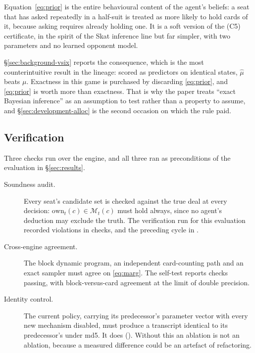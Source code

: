 Equation~\eqref{eq:prior} is the entire behavioural content of the agent's beliefs: a seat that has
asked repeatedly in a half-suit is treated as more likely to hold cards of it, because asking
requires already holding one. It is a soft version of the (C5) certificate, in the spirit of the Skat
inference line \cite{solinas-supervised,rebstock-inference,buro-kermit} but far simpler, with two
parameters and no learned opponent model.

\S\ref{sec:background-vsix} reports the consequence, which is the most counterintuitive result in the
lineage: scored as predictors on identical states, $\hat\mu$ beats $\mu$. Exactness in this game is
purchased by discarding \eqref{eq:prior}, and \eqref{eq:prior} is worth more than exactness. That is
why the paper treats ``exact Bayesian inference'' as an assumption to test rather than a property to
assume, and \S\ref{sec:development-alloc} is the second occasion on which the rule paid.

\subsection{Verification}
\label{sec:inference-verify}

Three checks run over the engine, and all three ran as preconditions of the evaluation in
\S\ref{sec:results}.

\begin{description}
\item[Soundness audit.] Every seat's candidate set is checked against the true deal at every
  decision: $\mathrm{own}_t(c) \in \mathcal{M}_t(c)$ must hold always, since no agent's deduction may
  exclude the truth. The verification run for this evaluation recorded
  \vsevenVerifyViolations{} violations in \vsevenVerifyChecks{} checks, and the preceding cycle
  \vsixAuditViolations{} in \vsixAuditChecks{}.
\item[Cross-engine agreement.] The block dynamic program, an independent card-counting path and an
  exact sampler must agree on \eqref{eq:marg}. The self-test reports \vsevenSelftestChecks{} checks
  passing, with block-versus-card agreement at the limit of double precision.
\item[Identity control.] The current policy, carrying its predecessor's parameter vector with every
  new mechanism disabled, must produce a transcript identical to its predecessor's under md5. It does
  (\vsixIdentity{}). Without this an ablation is not an ablation, because a measured difference could
  be an artefact of refactoring.
\end{description}

